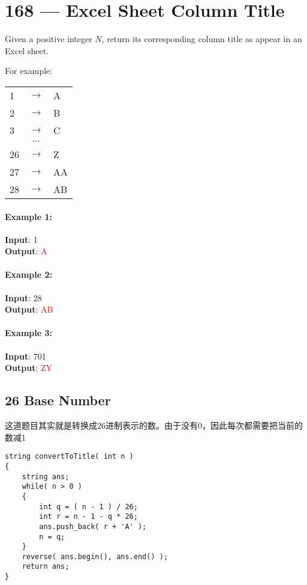 \section{168 --- Excel Sheet Column Title}
Given a positive integer $N$, return its corresponding column title as appear in an Excel sheet.
\par
For example:
\begin{table}[H]
\begin{tabular}{lcl}
1 & $\to$ & A \\
2 & $\to$ & B \\
3 & $\to$ & C \\
 & $\cdots$ & \\
26 & $\to$ & Z  \\
27 & $\to$ &AA  \\
28 & $\to$ &AB  
\end{tabular}
\end{table}
\paragraph{Example 1:}
\begin{flushleft}
\textbf{Input}: 1
\\
\textbf{Output}: \textcolor{red}{A}
\end{flushleft}
\paragraph{Example 2:}
\begin{flushleft}
\textbf{Input}: 28
\\
\textbf{Output}: \textcolor{red}{AB}
\end{flushleft}
\paragraph{Example 3:}
\begin{flushleft}
\textbf{Input}: 701
\\
\textbf{Output}: \textcolor{red}{ZY}
\end{flushleft}
\subsection{26 Base Number}
这道题目其实就是转换成26进制表示的数。由于没有0，因此每次都需要把当前的数减1

\setcounter{lstlisting}{0}
\begin{lstlisting}[style=customc, caption={Source Code}]
string convertToTitle( int n )
{
    string ans;
    while( n > 0 )
    {
        int q = ( n - 1 ) / 26;
        int r = n - 1 - q * 26;
        ans.push_back( r + 'A' );
        n = q;
    }
    reverse( ans.begin(), ans.end() );
    return ans;
}
\end{lstlisting}